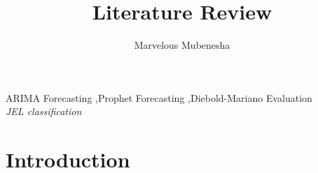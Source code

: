 \documentclass[12pt,preprint, authoryear]{elsarticle}
\numberwithin{equation}{section}
\numberwithin{figure}{section}
\numberwithin{table}{section}
\begin{document}
\begin{frontmatter}  %

\title{Literature Review}

\author[Add1]{Marvelous Mubenesha}





\address[Add1]{Honours Project, University of Cape Town, South Africa}



\vspace{1cm}

\begin{keyword}
\footnotesize{
ARIMA Forecasting \sep Prophet Forecasting \sep Diebold-Mariano
Evaluation \\ \vspace{0.3cm}
\textit{JEL classification} 
}
\end{keyword}
\vspace{0.5cm}
\end{frontmatter}



\pagestyle{fancy}
\chead{}
\lfoot{}
\lhead{}
\cfoot{}


\headsep 35pt %




\section{\texorpdfstring{Introduction
\label{Introduction}}{Introduction }}\label{introduction}
\end{document}
